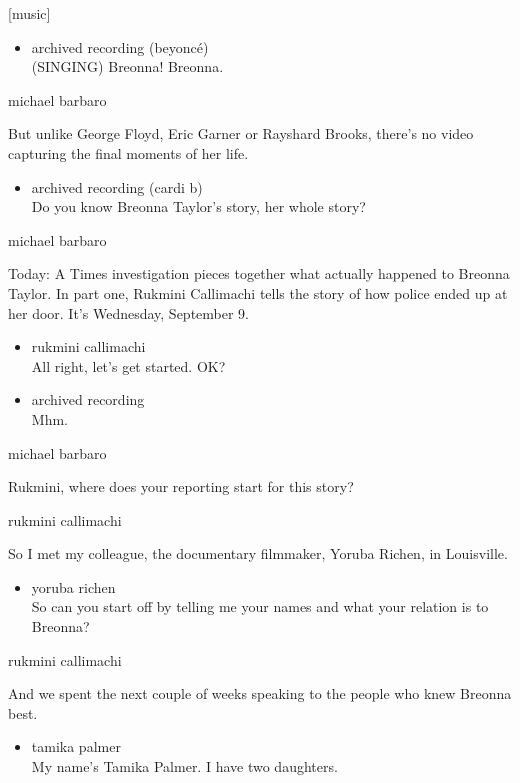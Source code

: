 {[}music{]}

\begin{itemize}
\tightlist
\item
  archived recording (beyoncé)\\
  (SINGING) Breonna! Breonna.
\end{itemize}

michael barbaro

But unlike George Floyd, Eric Garner or Rayshard Brooks, there's no
video capturing the final moments of her life.

\begin{itemize}
\tightlist
\item
  archived recording (cardi b)\\
  Do you know Breonna Taylor's story, her whole story?
\end{itemize}

michael barbaro

Today: A Times investigation pieces together what actually happened to
Breonna Taylor. In part one, Rukmini Callimachi tells the story of how
police ended up at her door. It's Wednesday, September 9.

\begin{itemize}
\item
  rukmini callimachi\\
  All right, let's get started. OK?
\item
  archived recording\\
  Mhm.
\end{itemize}

michael barbaro

Rukmini, where does your reporting start for this story?

rukmini callimachi

So I met my colleague, the documentary filmmaker, Yoruba Richen, in
Louisville.

\begin{itemize}
\tightlist
\item
  yoruba richen\\
  So can you start off by telling me your names and what your relation
  is to Breonna?
\end{itemize}

rukmini callimachi

And we spent the next couple of weeks speaking to the people who knew
Breonna best.

\begin{itemize}
\tightlist
\item
  tamika palmer\\
  My name's Tamika Palmer. I have two daughters.
\end{itemize}

